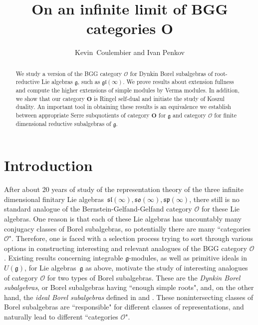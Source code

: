 \documentclass[11pt]{amsart}
\title[Infinite category O]{On an infinite limit of BGG categories O}
\author{Kevin~Coulembier and Ivan Penkov}
\newcommand{\cO}{\mathcal O}
\newcommand{\fg}{\mathfrak{g}}
\numberwithin{equation}{section}
\theoremstyle{plain}
\theoremstyle{remark}
\theoremstyle{remark}
\theoremstyle{construction}
\begin{document}
 
\date{} 
\begin{abstract} We study a version of the BGG category $\cO$ for Dynkin Borel subalgebras of root-reductive Lie algebras {$\mathfrak{g}$}, such as $\mathfrak{gl}(\infty)$. We prove results about extension fullness and compute the higher extensions of simple modules by Verma modules. {In addition, we} show that  {our} category  {$\textbf{O}$} is Ringel self-dual and initiate the study of Koszul duality. An important tool in obtaining these results is an equivalence we establish between appropriate Serre subquotients of  category {$\textbf{O}$} for $\fg$ and category $\cO$ for finite dimensional reductive subalgebras of $\fg$.
	\end{abstract}
	
	



\maketitle 



\section*{Introduction}

After about 20 years of study of the representation theory of the three infinite dimensional finitary Lie algebras~$\mathfrak{sl}(\infty),\mathfrak{so}(\infty),\mathfrak{sp}(\infty)$, there still is no standard analogue of the Bernstein-Gelfand-Gelfand category $\mathcal{O}$ for {these} Lie algebras. One reason is that each of these Lie algebras has uncountably many conjugacy classes of Borel subalgebras, so potentially there are many ``categories $\mathcal{O}$". Therefore, one is faced with a selection process trying to sort through various options in constructing interesting and relevant analogues of the BGG category $\mathcal{O}$. Existing results concerning integrable $\fg$-modules, as well as primitive ideals in 
$U(\fg)$, for Lie algebras~$\fg$ as above, motivate the study of interesting analogues of category $\mathcal{O}$ for two types of Borel subalgebras. These are the {\em Dynkin Borel subalgebras}, or Borel subalgebras having ``enough simple roots", and, on the other hand, the {\em ideal Borel subalgebras} defined in \cite{PP1} and \cite{PP2}. These nonintersecting classes of Borel subalgebras are ``responsible" for different classes of representations, and naturally lead to different ``categories $\mathcal{O}$".
\end{document}
